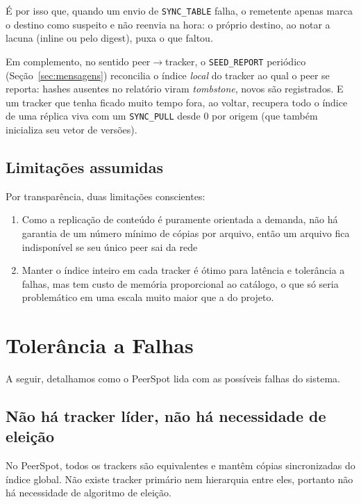 \documentclass[12pt, a4paper]{article}
\begin{document}
É por isso que, quando um envio de \texttt{SYNC\_TABLE} falha, o remetente apenas marca o destino como suspeito e não reenvia na hora: o próprio destino, ao notar a lacuna (inline ou pelo digest), puxa o que faltou.

Em complemento, no sentido peer$\rightarrow$tracker, o \texttt{SEED\_REPORT} periódico (Seção~\ref{sec:mensagens}) reconcilia o índice \textit{local} do tracker ao qual o peer se reporta: hashes ausentes no relatório viram \textit{tombstone}, novos são registrados. E um tracker que tenha ficado muito tempo fora, ao voltar, recupera todo o índice de uma réplica viva com um \texttt{SYNC\_PULL} desde 0 por origem (que também inicializa seu vetor de versões).

\subsection{Limitações assumidas}\label{sec:limit_repl}

Por transparência, duas limitações conscientes:

\begin{enumerate}
    \item Como a replicação de conteúdo é puramente orientada a demanda, não há garantia de um número mínimo de cópias por arquivo, então um arquivo fica indisponível se seu único peer sai da rede
    \item Manter o índice inteiro em cada tracker é ótimo para latência e tolerância a falhas, mas tem custo de memória proporcional ao catálogo, o que só seria problemático em uma escala muito maior que a do projeto.
\end{enumerate}


\section{Tolerância a Falhas}\label{sec:tolerancia}

A seguir, detalhamos como o PeerSpot lida com as possíveis falhas do sistema.

\subsection{Não há tracker líder, não há necessidade de eleição}\label{sec:sem_lider}

No PeerSpot, todos os trackers são equivalentes e mantêm cópias sincronizadas do índice global. Não existe tracker primário nem hierarquia entre eles, portanto não há necessidade de algoritmo de eleição. 
\end{document}
